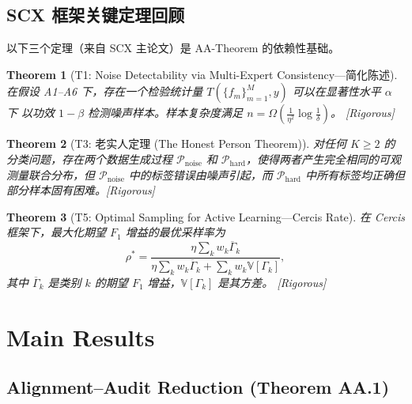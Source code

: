 \documentclass[12pt,a4paper]{article}
\newtheorem{theorem}{Theorem}[section]
\newcommand{\rigorous}{\textcolor{green!50!black}{\small\textsf{[Rigorous]}}}
\newcommand{\V}{\mathbb{V}}
\begin{document}
\subsection{SCX 框架关键定理回顾}

以下三个定理（来自 SCX 主论文）是 AA-Theorem 的依赖性基础。

\begin{theorem}[T1: Noise Detectability via Multi-Expert Consistency---简化陈述]
\label{thm:T1}
在假设 A1--A6 下，存在一个检验统计量 $T(\{f_m\}_{m=1}^M, y)$ 可以在显著性水平 $\alpha$ 下
以功效 $1-\beta$ 检测噪声样本。样本复杂度满足 $n = \Omega(\frac{1}{\eta^2}\log\frac{1}{\delta})$。
\rigorous
\end{theorem}

\begin{theorem}[T3: 老实人定理 (The Honest Person Theorem)]
\label{thm:T3}
对任何 $K\geq 2$ 的分类问题，存在两个数据生成过程 $\mathcal{P}_{\mathrm{noise}}$ 和
$\mathcal{P}_{\mathrm{hard}}$，使得两者产生完全相同的可观测量联合分布，但
$\mathcal{P}_{\mathrm{noise}}$ 中的标签错误由噪声引起，而 $\mathcal{P}_{\mathrm{hard}}$
中所有标签均正确但部分样本固有困难。\rigorous
\end{theorem}

\begin{theorem}[T5: Optimal Sampling for Active Learning---Cercis Rate]
\label{thm:T5}
在 Cercis 框架下，最大化期望 $F_1$ 增益的最优采样率为
\[
\rho^* = \frac{\eta\sum_k w_k\overline{\Gamma}_k}
              {\eta\sum_k w_k\overline{\Gamma}_k + \sum_k w_k\V[\Gamma_k]},
\]
其中 $\overline{\Gamma}_k$ 是类别 $k$ 的期望 $F_1$ 增益，$\V[\Gamma_k]$ 是其方差。
\rigorous
\end{theorem}

\section{Main Results}

\subsection{Alignment--Audit Reduction (Theorem AA.1)}
\end{document}
